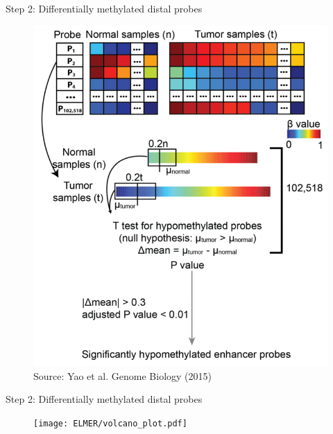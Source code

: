 \documentclass[slidestop,compress,11pt,xcolor=dvipsnames]{beamer}
\begin{document}
\begin{frame}{Step 2: Differentially methylated distal probes}
 \vspace*{-0.4cm}
 \begin{figure}
  \centering
  \includegraphics[width=0.6\linewidth]{ELMER/diffmeth.png}{\tiny{\\\vspace*{-0.2cm}Source: Yao et al. Genome Biology (2015)}}
 \end{figure}
\end{frame}



\begin{frame}{Step 2: Differentially methylated distal probes}
 \begin{figure}
  \centering
  \texttt{[image: ELMER/volcano\_plot.pdf]}
 \end{figure}
\end{frame}
\end{document}
